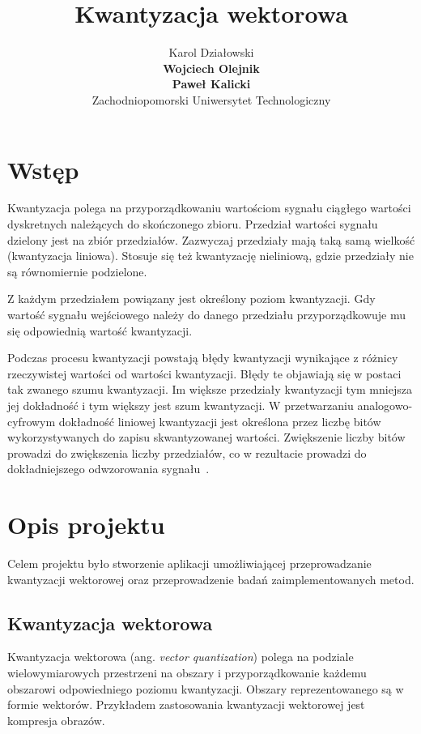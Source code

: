\documentclass{article}
\title{Kwantyzacja wektorowa}
\author{
  Karol Działowski \\
  \textbf{Wojciech Olejnik} \\
  \textbf{Paweł Kalicki} \\
  Zachodniopomorski Uniwersytet Technologiczny
}
\begin{document}
\maketitle
\begin{abstract}
  \lipsum[1-2]
\end{abstract}

\newpage

\tableofcontents

\newpage



\section{Wstęp}

Kwantyzacja polega na przyporządkowaniu wartościom sygnału ciągłego wartości dyskretnych należących do skończonego zbioru.
Przedział wartości sygnału dzielony jest na zbiór przedziałów.
Zazwyczaj przedziały mają taką samą wielkość (kwantyzacja liniowa).
Stosuje się też kwantyzację nieliniową, gdzie przedziały nie są równomiernie podzielone.

Z każdym przedziałem powiązany jest określony poziom kwantyzacji.
Gdy wartość sygnału wejściowego należy do danego przedziału przyporządkowuje mu się odpowiednią wartość kwantyzacji.

Podczas procesu kwantyzacji powstają błędy kwantyzacji wynikające z różnicy rzeczywistej wartości od wartości kwantyzacji.
Błędy te objawiają się w postaci tak zwanego szumu kwantyzacji.
Im większe przedziały kwantyzacji tym mniejsza jej dokładność i tym większy jest szum kwantyzacji.
W przetwarzaniu analogowo-cyfrowym dokładność liniowej kwantyzacji jest określona przez liczbę bitów wykorzystywanych do zapisu skwantyzowanej wartości.
Zwiększenie liczby bitów prowadzi do zwiększenia liczby przedziałów, co w rezultacie prowadzi do dokładniejszego odwzorowania \mbox{sygnału \cite{drozdek2007wprowadzenie}.}

\section{Opis projektu}

Celem projektu było stworzenie aplikacji umożliwiającej przeprowadzanie kwantyzacji wektorowej oraz przeprowadzenie badań
zaimplementowanych metod.

\subsection{Kwantyzacja wektorowa}
Kwantyzacja wektorowa (ang. \emph{vector quantization}) polega na podziale wielowymiarowych przestrzeni na obszary i
przyporządkowanie każdemu obszarowi odpowiedniego poziomu kwantyzacji.
Obszary reprezentowanego są w formie wektorów.
Przykładem zastosowania kwantyzacji wektorowej jest kompresja obrazów.
\end{document}
